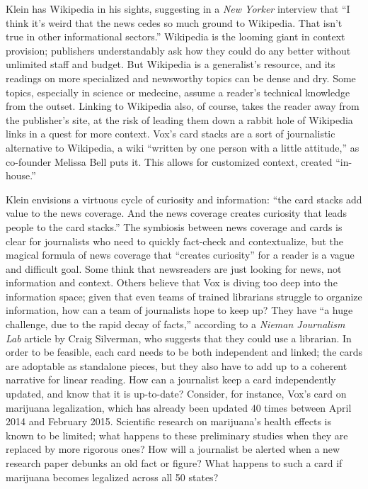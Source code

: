 Klein has Wikipedia in his sights, suggesting in a \emph{New Yorker} interview that ``I think it's weird that the news cedes so much ground to Wikipedia. That isn't true in other informational sectors.''\autocite{coscarelli_ezra_2014} Wikipedia is the looming giant in context provision; publishers understandably ask how they could do any better without unlimited staff and budget. But Wikipedia is a generalist's resource, and its readings on more specialized and newsworthy topics can be dense and dry. Some topics, especially in science or medecine, assume a reader's technical knowledge from the outset. Linking to Wikipedia also, of course, takes the reader away from the publisher's site, at the risk of leading them down a rabbit hole of Wikipedia links in a quest for more context. Vox's card stacks are a sort of journalistic alternative to Wikipedia, a wiki ``written by one person with a little attitude,'' as co-founder Melissa Bell puts it.\autocite{kaufman_vox_2014} This allows for customized context, created ``in-house.''

Klein envisions a virtuous cycle of curiosity and information: ``the card stacks add value to the news coverage. And the news coverage creates curiosity that leads people to the card stacks.''\autocite{coscarelli_ezra_2014} The symbiosis between news coverage and cards is clear for journalists who need to quickly fact-check and contextualize, but the magical formula of news coverage that ``creates curiosity'' for a reader is a vague and difficult goal. Some think that newsreaders are just looking for news, not information and context. Others believe that Vox is diving too deep into the information space; given that even teams of trained librarians struggle to organize information, how can a team of journalists hope to keep up? They have ``a huge challenge, due to the rapid decay of facts,'' according to a \emph{Nieman Journalism Lab} article by Craig Silverman, who suggests that they could use a librarian.\autocite{silverman_why_2014} In order to be feasible, each card needs to be both independent and linked; the cards are adoptable as standalone pieces, but they also have to add up to a coherent narrative for linear reading. How can a journalist keep a card independently updated, and know that it is up-to-date? Consider, for instance, Vox's card on marijuana legalization, which has already been updated 40 times between April 2014 and February 2015.\autocite{lopez_everything_????} Scientific research on marijuana's health effects is known to be limited; what happens to these preliminary studies when they are replaced by more rigorous ones? How will a journalist be alerted when a new research paper debunks an old fact or figure? What happens to such a card if marijuana becomes legalized across all 50 states?

